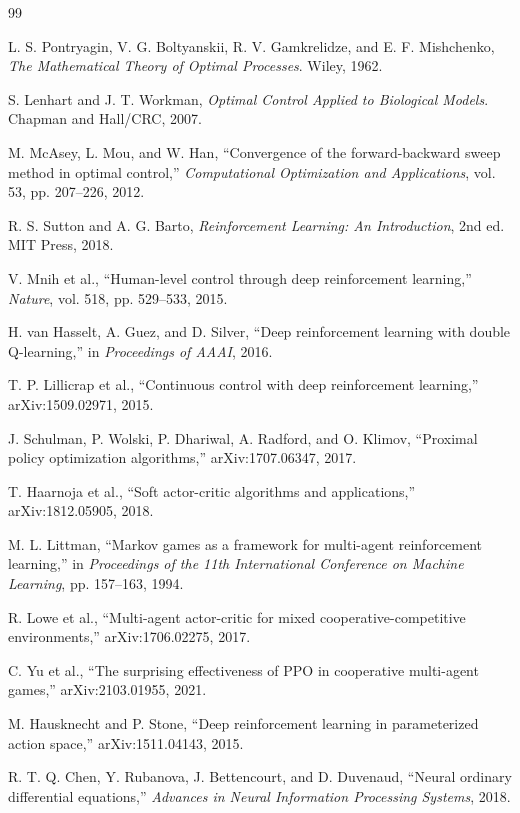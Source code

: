 \documentclass[11pt,a4paper]{article}
\begin{document}
\begin{thebibliography}{99}

L. S. Pontryagin, V. G. Boltyanskii, R. V. Gamkrelidze, and E. F. Mishchenko, \emph{The Mathematical Theory of Optimal Processes}. Wiley, 1962.

S. Lenhart and J. T. Workman, \emph{Optimal Control Applied to Biological Models}. Chapman and Hall/CRC, 2007.

M. McAsey, L. Mou, and W. Han, ``Convergence of the forward-backward sweep method in optimal control,'' \emph{Computational Optimization and Applications}, vol. 53, pp. 207--226, 2012.

R. S. Sutton and A. G. Barto, \emph{Reinforcement Learning: An Introduction}, 2nd ed. MIT Press, 2018.

V. Mnih et al., ``Human-level control through deep reinforcement learning,'' \emph{Nature}, vol. 518, pp. 529--533, 2015.

H. van Hasselt, A. Guez, and D. Silver, ``Deep reinforcement learning with double Q-learning,'' in \emph{Proceedings of AAAI}, 2016.

T. P. Lillicrap et al., ``Continuous control with deep reinforcement learning,'' arXiv:1509.02971, 2015.

J. Schulman, P. Wolski, P. Dhariwal, A. Radford, and O. Klimov, ``Proximal policy optimization algorithms,'' arXiv:1707.06347, 2017.

T. Haarnoja et al., ``Soft actor-critic algorithms and applications,'' arXiv:1812.05905, 2018.

M. L. Littman, ``Markov games as a framework for multi-agent reinforcement learning,'' in \emph{Proceedings of the 11th International Conference on Machine Learning}, pp. 157--163, 1994.

R. Lowe et al., ``Multi-agent actor-critic for mixed cooperative-competitive environments,'' arXiv:1706.02275, 2017.

C. Yu et al., ``The surprising effectiveness of PPO in cooperative multi-agent games,'' arXiv:2103.01955, 2021.

M. Hausknecht and P. Stone, ``Deep reinforcement learning in parameterized action space,'' arXiv:1511.04143, 2015.

R. T. Q. Chen, Y. Rubanova, J. Bettencourt, and D. Duvenaud, ``Neural ordinary differential equations,'' \emph{Advances in Neural Information Processing Systems}, 2018.


\end{thebibliography}
\end{document}

